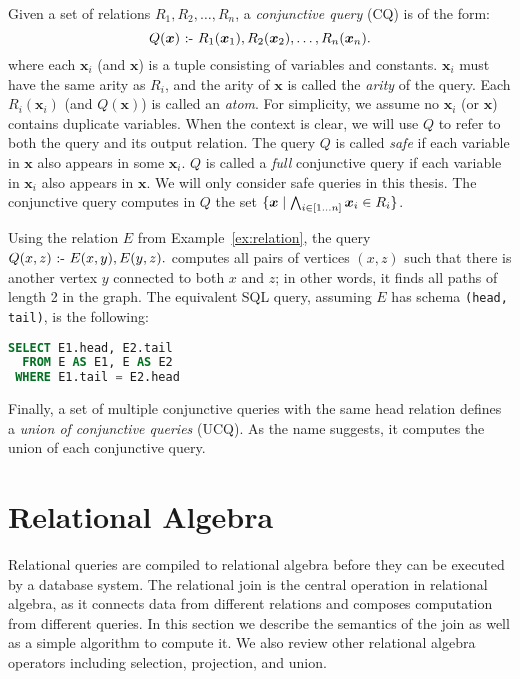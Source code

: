 Given a set of relations $R_1, R_2, \ldots, R_n$, 
 a {\em conjunctive query} (CQ) is of the form:
\[
  Q(\bm{x}) \text{ :- } R_1(\bm{x}_1), R_2(\bm{x}_2), \ldots, R_n(\bm{x}_n).
\]
where each $\bm{x}_i$ (and $\bm{x}$) is a tuple consisting of variables and constants.
$\bm{x}_i$ must have the same arity as $R_i$,
 and the arity of $\bm{x}$ is called the {\em arity} of the query.
Each $R_i({\bm x_i})$ (and $Q({\bm x})$) is called an {\em atom}.
For simplicity, we assume no $\bm{x}_i$ (or $\bm{x}$) contains duplicate variables.
When the context is clear, 
 we will use $Q$ to refer to both the query and its output relation.
The query $Q$ is called {\em safe} if each variable in $\bm{x}$ also appears in some $\bm{x}_i$.
$Q$ is called a {\em full} conjunctive query if each variable in $\bm{x}_i$ also appears in $\bm{x}$.
We will only consider safe queries in this thesis.
The conjunctive query computes in $Q$ the set $\{{\bm x}\mid{\bigwedge_{i \in [1 \ldots n]} {\bm x_i} \in R_i}\}$.

\begin{ex}
\label{ex:cq}
Using the relation $E$ from Example~\ref{ex:relation},
 the query $Q(x, z) \text{ :- } E(x, y), E(y, z).$
 computes all pairs of vertices $(x, z)$ 
 such that there is another vertex $y$ 
 connected to both $x$ and $z$;
 in other words, it finds all paths of length 2 in the graph.
The equivalent SQL query, assuming $E$ has schema \texttt{(head, tail)}, is the following:
\begin{lstlisting}[language=SQL]
SELECT E1.head, E2.tail
  FROM E AS E1, E AS E2
 WHERE E1.tail = E2.head
\end{lstlisting}
\end{ex}

Finally, a set of multiple conjunctive queries with the same head relation
 defines a {\em union of conjunctive queries} (UCQ).
As the name suggests, it computes the union of each conjunctive query.

\section{Relational Algebra}
\label{sec:join}

Relational queries are compiled to relational algebra 
 before they can be executed by a database system.
The relational join is the central operation in relational algebra,
 as it connects data from different relations 
 and composes computation from different queries.
In this section we describe the semantics of the join
 as well as a simple algorithm to compute it.
We also review other relational algebra operators
 including selection, projection, and union.


